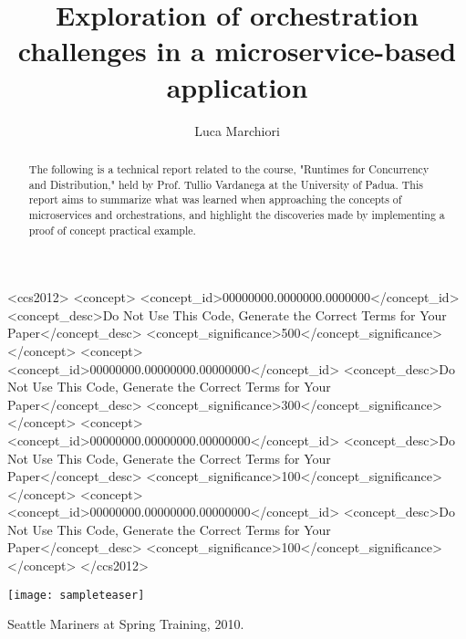 \documentclass[sigplan,screen]{acmart}
\begin{document}
\title{Exploration of orchestration challenges in a microservice-based application}

\author{Luca Marchiori}


\begin{abstract}
  The following is a technical report related to the course, "Runtimes for Concurrency and Distribution," held by Prof. Tullio Vardanega at the University of Padua. This report aims to summarize what was learned when approaching the concepts of microservices and orchestrations, and highlight the discoveries made by implementing a proof of concept practical example.
\end{abstract}

\begin{CCSXML}
<ccs2012>
 <concept>
  <concept_id>00000000.0000000.0000000</concept_id>
  <concept_desc>Do Not Use This Code, Generate the Correct Terms for Your Paper</concept_desc>
  <concept_significance>500</concept_significance>
 </concept>
 <concept>
  <concept_id>00000000.00000000.00000000</concept_id>
  <concept_desc>Do Not Use This Code, Generate the Correct Terms for Your Paper</concept_desc>
  <concept_significance>300</concept_significance>
 </concept>
 <concept>
  <concept_id>00000000.00000000.00000000</concept_id>
  <concept_desc>Do Not Use This Code, Generate the Correct Terms for Your Paper</concept_desc>
  <concept_significance>100</concept_significance>
 </concept>
 <concept>
  <concept_id>00000000.00000000.00000000</concept_id>
  <concept_desc>Do Not Use This Code, Generate the Correct Terms for Your Paper</concept_desc>
  <concept_significance>100</concept_significance>
 </concept>
</ccs2012>
\end{CCSXML}


\begin{teaserfigure}
  \texttt{[image: sampleteaser]}
  \caption{Seattle Mariners at Spring Training, 2010.}
  \label{fig:teaser}
\end{teaserfigure}
\end{document}
